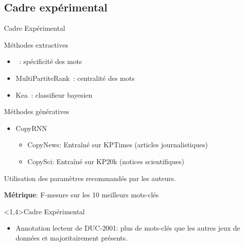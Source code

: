 \subsection{Cadre expérimental}

\begin{frame}{Cadre Expérimental}
    \begin{block}{Méthodes extractives}
    \begin{itemize}
        \item \tfidf{}~\cite{jones_statistical_1972}: spécificité des mots
        \item MultiPartiteRank~\cite{boudin_unsupervised_2018}: centralité des mots
        \item Kea~\cite{witten_kea:_1999}: classifieur bayesien
    \end{itemize}
    \end{block}
    
    \begin{block}{Méthodes génératives}
    \begin{itemize}
        \item CopyRNN
        \begin{itemize}
        \item \colorbox{color2!40}{CopyNews}: Entraîné sur \colorbox{color2!40}{KPTimes} (articles journalistiques)
        \item \colorbox{color1!40}{CopySci}: Entraîné sur \colorbox{color1!40}{KP20k} (notices scientifiques)
        \end{itemize}
    \end{itemize}
    \end{block}
    
    Utilisation des paramètres recommandés par les auteurs.
    
    \textbf{Métrique}: F-mesure sur les 10 meilleurs mots-clés
\end{frame}

\begin{frame}<1,4>{Cadre Expérimental}
    
    \begin{itemize}
        \item Annotation lecteur de DUC-2001: plus de mots-clés que les autres jeux de données et majoritairement présents.
    \end{itemize}
    
\end{frame}


